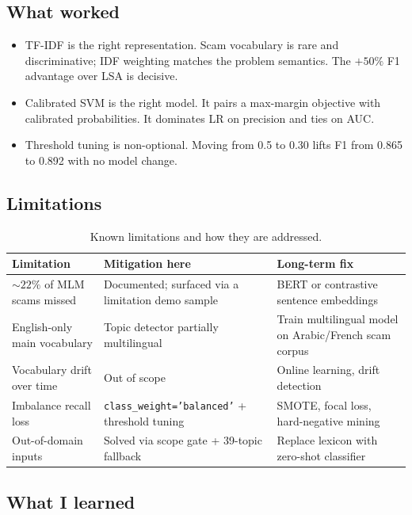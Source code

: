 \documentclass[11pt,a4paper]{article}
\newcommand{\code}[1]{\texttt{\small #1}}
\begin{document}
\subsection{What worked}

\begin{itemize}
    \item TF-IDF is the right representation. Scam vocabulary is rare and
          discriminative; IDF weighting matches the problem semantics. The
          $+50\%$ F1 advantage over LSA is decisive.
    \item Calibrated SVM is the right model. It pairs a max-margin
          objective with calibrated probabilities. It dominates LR on
          precision and ties on AUC.
    \item Threshold tuning is non-optional. Moving from 0.5 to 0.30 lifts
          F1 from 0.865 to 0.892 with no model change.
\end{itemize}

\subsection{Limitations}

\begin{table}[H]
\centering
\caption{Known limitations and how they are addressed.}
\renewcommand{\arraystretch}{1.2}
\begin{tabularx}{\linewidth}{X X X}
\toprule
\textbf{Limitation} & \textbf{Mitigation here} & \textbf{Long-term fix} \\
\midrule
${\sim}22\%$ of MLM scams missed & Documented; surfaced via a limitation demo sample & BERT or contrastive sentence embeddings \\
English-only main vocabulary    & Topic detector partially multilingual & Train multilingual model on Arabic/French scam corpus \\
Vocabulary drift over time      & Out of scope                          & Online learning, drift detection \\
Imbalance recall loss           & \code{class\_weight='balanced'} + threshold tuning & SMOTE, focal loss, hard-negative mining \\
Out-of-domain inputs            & Solved via scope gate + 39-topic fallback & Replace lexicon with zero-shot classifier \\
\bottomrule
\end{tabularx}
\end{table}

\subsection{What I learned}
\end{document}
